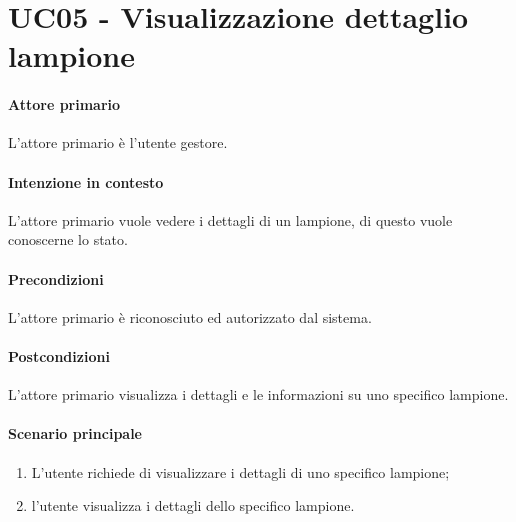 \section{UC05 - Visualizzazione dettaglio lampione}\label{uc:05}
\paragraph{Attore primario} L'attore primario è l'utente gestore.
\paragraph{Intenzione in contesto} L'attore primario vuole vedere i dettagli di un lampione, di questo vuole conoscerne lo stato.
\paragraph{Precondizioni}L'attore primario è riconosciuto ed autorizzato dal sistema.
\paragraph{Postcondizioni} L'attore primario visualizza i dettagli e le informazioni su uno specifico lampione.
\paragraph{Scenario principale}
\begin{enumerate}
    \item L'utente richiede di visualizzare i dettagli di uno specifico lampione;
    \item l'utente visualizza i dettagli dello specifico lampione.
\end{enumerate}